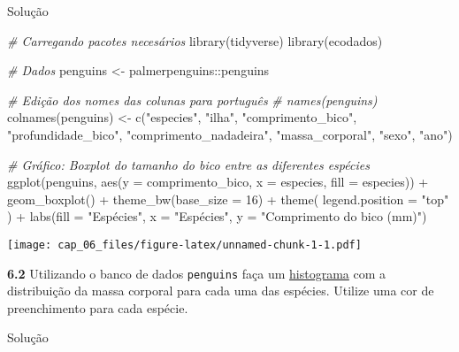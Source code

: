 \documentclass[
]{book}
\newenvironment{Shaded}{\begin{snugshade}}{\end{snugshade}}
\newcommand{\AttributeTok}[1]{\textcolor[rgb]{0.77,0.63,0.00}{#1}}
\newcommand{\CommentTok}[1]{\textcolor[rgb]{0.56,0.35,0.01}{\textit{#1}}}
\newcommand{\DecValTok}[1]{\textcolor[rgb]{0.00,0.00,0.81}{#1}}
\newcommand{\FunctionTok}[1]{\textcolor[rgb]{0.00,0.00,0.00}{#1}}
\newcommand{\NormalTok}[1]{#1}
\newcommand{\OtherTok}[1]{\textcolor[rgb]{0.56,0.35,0.01}{#1}}
\newcommand{\SpecialCharTok}[1]{\textcolor[rgb]{0.00,0.00,0.00}{#1}}
\newcommand{\StringTok}[1]{\textcolor[rgb]{0.31,0.60,0.02}{#1}}
\begin{document}
Solução

\begin{Shaded}
\begin{Highlighting}[]

\CommentTok{\# Carregando pacotes necesários}
\FunctionTok{library}\NormalTok{(tidyverse)}
\FunctionTok{library}\NormalTok{(ecodados)}

\CommentTok{\# Dados}
\NormalTok{penguins }\OtherTok{\textless{}{-}}\NormalTok{ palmerpenguins}\SpecialCharTok{::}\NormalTok{penguins}

\CommentTok{\# Edição dos nomes das colunas para português }
\CommentTok{\# names(penguins)}
\FunctionTok{colnames}\NormalTok{(penguins) }\OtherTok{\textless{}{-}} \FunctionTok{c}\NormalTok{(}\StringTok{"especies"}\NormalTok{, }\StringTok{"ilha"}\NormalTok{, }\StringTok{"comprimento\_bico"}\NormalTok{, }
                        \StringTok{"profundidade\_bico"}\NormalTok{, }\StringTok{"comprimento\_nadadeira"}\NormalTok{, }
                        \StringTok{"massa\_corporal"}\NormalTok{, }\StringTok{"sexo"}\NormalTok{, }\StringTok{"ano"}\NormalTok{)}

\CommentTok{\# Gráfico: Boxplot do tamanho do bico entre as diferentes espécies}
\FunctionTok{ggplot}\NormalTok{(penguins, }\FunctionTok{aes}\NormalTok{(}\AttributeTok{y =}\NormalTok{ comprimento\_bico, }\AttributeTok{x =}\NormalTok{ especies, }\AttributeTok{fill =}\NormalTok{ especies)) }\SpecialCharTok{+}
  \FunctionTok{geom\_boxplot}\NormalTok{() }\SpecialCharTok{+}
  \FunctionTok{theme\_bw}\NormalTok{(}\AttributeTok{base\_size =} \DecValTok{16}\NormalTok{) }\SpecialCharTok{+}
  \FunctionTok{theme}\NormalTok{(}
    \AttributeTok{legend.position =} \StringTok{"top"}
\NormalTok{  ) }\SpecialCharTok{+}
  \FunctionTok{labs}\NormalTok{(}\AttributeTok{fill =} \StringTok{"Espécies"}\NormalTok{,}
       \AttributeTok{x =} \StringTok{"Espécies"}\NormalTok{, }\AttributeTok{y =} \StringTok{"Comprimento do bico (mm)"}\NormalTok{)}
\end{Highlighting}
\end{Shaded}

\texttt{[image: cap\_06\_files/figure-latex/unnamed-chunk-1-1.pdf]}

\textbf{6.2}
Utilizando o banco de dados \texttt{penguins} faça um \href{https://analises-ecologicas.netlify.app/cap6.html\#histograma-histogram}{histograma} com a distribuição da massa corporal para cada uma das espécies. Utilize uma cor de preenchimento para cada espécie.

Solução
\end{document}
